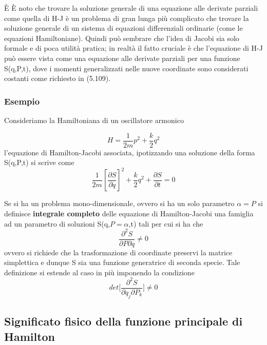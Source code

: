 \begin{remark}
	\`{E} È noto che trovare la soluzione generale di una equazione alle derivate parziali come quella di H-J è un problema di gran lunga pi\`{u} complicato che trovare la soluzione generale di un sistema di equazioni differenziali ordinarie (come le equazioni Hamiltoniane). Quindi pu\`{o} sembrare che l'idea di Jacobi sia solo formale e di poca utilit\`{a} pratica; in realt\`{a}
il fatto cruciale \`{e} che l'equazione di H-J pu\`{o} essere vista come una equazione alle derivate parziali per una funzione S(q,P,t), dove i momenti generalizzati nelle nuove coordinate sono considerati costanti come richiesto in (5.109).
\end{remark}

\subsubsection{Esempio}
Consideriamo la Hamiltoniana di un oscillatore armonico 

\begin{equation*}
	H=\frac{1}{2 m} p^2+\frac{k}{2} q^2
\end{equation*}
l'equazione di Hamilton-Jacobi associata, ipotizzando una soluzione della forma S(q,P,t) si scrive come 
\begin{equation*}
	\frac{1}{2 m}\left[\frac{\partial S}{\partial q}\right]^2+\frac{k}{2} q^2+\frac{\partial S}{\partial t}=0
\end{equation*}

\begin{definition}
	Se si ha un problema mono-dimensionale, ovvero si ha un solo parametro $\alpha=P$ si definisce \textbf{integrale completo} delle equazione di Hamilton-Jacobi una famiglia ad un parametro di soluzioni S(q,$P =\alpha$,t) tali per cui si ha che 
	\begin{equation*}
		\frac{\partial^2 S}{\partial P \partial q} \neq 0
	\end{equation*}
ovvero si richiede che la trasformazione di coordinate preservi la matrice simplettica e dunque S sia una funzione generatrice di seconda specie. \newline
Tale definizione si estende al caso in pi\`{u} imponendo la condizione
\begin{equation*}
	det\Big [ \frac{\partial^2 S}{\partial q_j \partial P_k}\Big ] \neq 0
\end{equation*}
\end{definition}

\subsection{Significato fisico della funzione principale di Hamilton}

